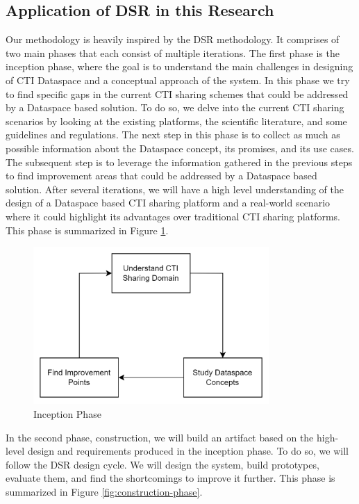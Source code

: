 \subsection{Application of DSR in this Research}
Our methodology is heavily inspired by the DSR methodology.
It comprises of two main phases that each consist of multiple iterations.
The first phase is the inception phase, where the goal is to understand the main challenges in designing of CTI Dataspace and a conceptual approach of the system.
In this phase we try to find specific gaps in the current CTI sharing schemes that could be addressed by a Dataspace based solution.
To do so, we delve into the current CTI sharing scenarios by looking at the existing platforms, the scientific literature, and some guidelines and regulations.
The next step in this phase is to collect as much as possible information about the Dataspace concept, its promises, and its use cases.
The subsequent step is to leverage the information gathered in the previous steps to find improvement areas that could be addressed by a Dataspace based solution. After several iterations, we will have a high level understanding of the design of a Dataspace based CTI sharing platform and a real-world scenario where it could highlight its advantages over traditional CTI sharing platforms. This phase is summarized in Figure \ref{fig:inception-phase}.

\begin{figure}[ht]
    \centering
    \includegraphics[width=0.8\textwidth]{diagrams/conceptual/methodology-p1}
    \caption{Inception Phase}
    \label{fig:inception-phase}
\end{figure}

In the second phase, construction, we will build an artifact based on the high-level design and requirements produced in the inception phase. To do so, we will follow the DSR design cycle. We will design the system, build prototypes, evaluate them, and find the shortcomings to improve it further. This phase is summarized in Figure \ref{fig:construction-phase}.

